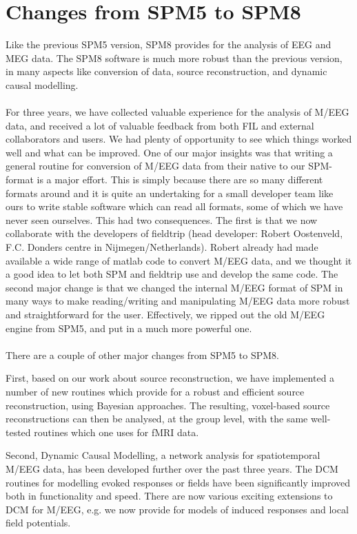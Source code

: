 \section{Changes from SPM5 to SPM8}
Like the previous SPM5 version, SPM8 provides for the analysis of EEG
and MEG data. The SPM8 software is much more robust than the previous
version, in many aspects like conversion of data, source
reconstruction, and dynamic causal modelling.
\\
\\
For three years, we have collected valuable experience
for the analysis of M/EEG data, and received a lot of valuable
feedback from both FIL and external collaborators and users. We had
plenty of opportunity to see which things worked well and what can be
improved. One of our major insights was that writing a general routine
for conversion of M/EEG data from their native to our SPM-format is a
major effort. This is simply because there are so many different
formats 
around and it is quite an undertaking for a small developer team like
ours to write stable software which can read all formats, some of
which we have never seen ourselves. This had two consequences. The
first is that we now collaborate with the developers of fieldtrip
(head developer: Robert Oostenveld, F.C. Donders centre in
Nijmegen/Netherlands). Robert already had made available a wide range of
matlab code to convert M/EEG data, and we thought it a good idea to
let both SPM and fieldtrip use and develop the same code. The second
major change is that we changed the internal M/EEG format of SPM in
many ways to make reading/writing and manipulating M/EEG data more
robust and straightforward for the user. Effectively, we ripped out
the old M/EEG engine from SPM5, and put in a much more powerful one.
\\
\\
There are a couple of other major changes from SPM5 to SPM8. 

First, based on our work about source reconstruction, we have
implemented a number of new routines which provide for a robust and
efficient source reconstruction, using Bayesian approaches. The
resulting, voxel-based source reconstructions can then be analysed, at
the group level, with the same well-tested routines which one uses for
fMRI data.

Second, Dynamic Causal Modelling, a network analysis for spatiotemporal
M/EEG data, has been developed further over the past three years. The
DCM routines for modelling evoked responses or 
fields have been significantly improved both in functionality and
speed. There are now various exciting extensions to DCM for M/EEG,
e.g. we now provide for models of induced responses and local field
potentials. 

